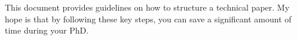 This document provides guidelines on how to structure a technical paper. 
My hope is that by following these key steps, you can save a significant amount of time
during your PhD.
